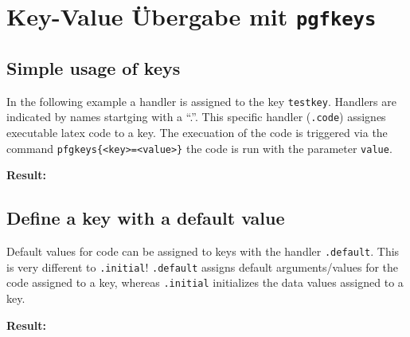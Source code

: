 \documentclass{scrartcl}
\let\inlatex\lstinline
\newenvironment{result}
    {\noindent\ignorespaces\textbf{Result:}\newline}
    {\par\noindent\ignorespacesafterend}
\begin{document}
\section{Key-Value Übergabe mit \inlatex{pgfkeys}}

\subsection{Simple usage of keys}

In the following example a handler is assigned to the key
\inlatex{testkey}. Handlers are indicated by names startging with a \enquote{.}. 
This specific handler (\inlatex{.code}) assignes executable latex code to a key.
The execuation of the code is triggered via the command \inlatex$pfgkeys{<key>=<value>}$ 
the code is run with the parameter \inlatex{value}.

\begin{latex}
\end{latex}

\begin{result}
\end{result}


\subsection{Define a key with a default value}

Default values for code can be assigned to keys with the handler \inlatex{.default}.
This is very different to \inlatex{.initial}!
\inlatex{.default} assigns default arguments/values for the code assigned to a key, 
whereas \inlatex{.initial} initializes the data values assigned to a key. 

\begin{latex}

\end{latex}

\begin{result}

\end{result}
\end{document}
